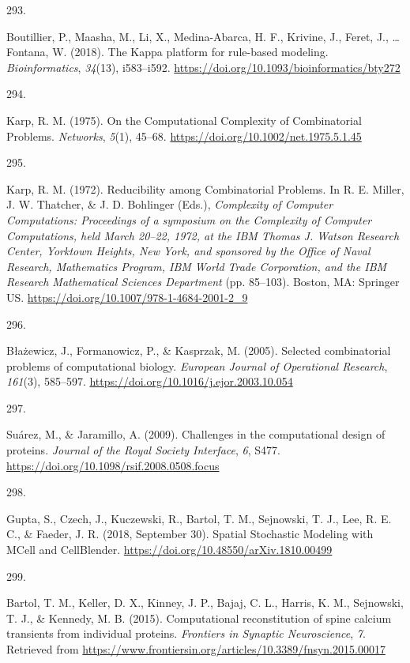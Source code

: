\documentclass[
  11pt,
  letterpaper,
]{scrreprt}
\newlength{\cslhangindent}
\newlength{\csllabelwidth}
\newenvironment{CSLReferences}[2] %
 {\begin{list}{}{%
  \setlength{\itemindent}{0pt}
  \setlength{\leftmargin}{0pt}
  \setlength{\parsep}{0pt}
  \ifodd #1
   \setlength{\leftmargin}{\cslhangindent}
   \setlength{\itemindent}{-1\cslhangindent}
  \fi
  \setlength{\itemsep}{#2\baselineskip}}}
 {\end{list}}
\newcommand{\CSLLeftMargin}[1]{\parbox[t]{\csllabelwidth}{\strut#1\strut}}
\newcommand{\CSLRightInline}[1]{\parbox[t]{\linewidth - \csllabelwidth}{\strut#1\strut}}
\begin{document}
\begin{CSLReferences}{0}{0}
\CSLLeftMargin{293. }%
\CSLRightInline{Boutillier, P., Maasha, M., Li, X., Medina-Abarca, H.
F., Krivine, J., Feret, J., \ldots{} Fontana, W. (2018). The {Kappa}
platform for rule-based modeling. \emph{Bioinformatics}, \emph{34}(13),
i583--i592. \url{https://doi.org/10.1093/bioinformatics/bty272}}

\CSLLeftMargin{294. }%
\CSLRightInline{Karp, R. M. (1975). On the {Computational Complexity} of
{Combinatorial Problems}. \emph{Networks}, \emph{5}(1), 45--68.
\url{https://doi.org/10.1002/net.1975.5.1.45}}

\CSLLeftMargin{295. }%
\CSLRightInline{Karp, R. M. (1972). Reducibility among {Combinatorial
Problems}. In R. E. Miller, J. W. Thatcher, \& J. D. Bohlinger (Eds.),
\emph{Complexity of {Computer Computations}: {Proceedings} of a
symposium on the {Complexity} of {Computer Computations}, held {March}
20--22, 1972, at the {IBM Thomas J}. {Watson Research Center}, {Yorktown
Heights}, {New York}, and sponsored by the {Office} of {Naval Research},
{Mathematics Program}, {IBM World Trade Corporation}, and the {IBM
Research Mathematical Sciences Department}} (pp. 85--103). Boston, MA:
Springer US. \url{https://doi.org/10.1007/978-1-4684-2001-2_9}}

\CSLLeftMargin{296. }%
\CSLRightInline{Błażewicz, J., Formanowicz, P., \& Kasprzak, M. (2005).
Selected combinatorial problems of computational biology. \emph{European
Journal of Operational Research}, \emph{161}(3), 585--597.
\url{https://doi.org/10.1016/j.ejor.2003.10.054}}

\CSLLeftMargin{297. }%
\CSLRightInline{Suárez, M., \& Jaramillo, A. (2009). Challenges in the
computational design of proteins. \emph{Journal of the Royal Society
Interface}, \emph{6}, S477.
\url{https://doi.org/10.1098/rsif.2008.0508.focus}}

\CSLLeftMargin{298. }%
\CSLRightInline{Gupta, S., Czech, J., Kuczewski, R., Bartol, T. M.,
Sejnowski, T. J., Lee, R. E. C., \& Faeder, J. R. (2018, September 30).
Spatial {Stochastic Modeling} with {MCell} and {CellBlender}.
\url{https://doi.org/10.48550/arXiv.1810.00499}}

\CSLLeftMargin{299. }%
\CSLRightInline{Bartol, T. M., Keller, D. X., Kinney, J. P., Bajaj, C.
L., Harris, K. M., Sejnowski, T. J., \& Kennedy, M. B. (2015).
Computational reconstitution of spine calcium transients from individual
proteins. \emph{Frontiers in Synaptic Neuroscience}, \emph{7}. Retrieved
from
\url{https://www.frontiersin.org/articles/10.3389/fnsyn.2015.00017}}


\end{CSLReferences}
\end{document}
